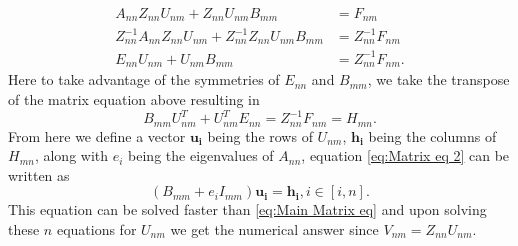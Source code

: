 \documentclass[11pt,letterpaper]{article}
\newcommand{\fpar}[1]{\left({#1}\right)} %
\begin{document}
\begin{align}
    A_{nn}Z_{nn}U_{nm}+Z_{nn}U_{nm}B_{mm} &= F_{nm}\nonumber\\
    Z_{nn}^{-1}A_{nn}Z_{nn}U_{nm}+Z_{nn}^{-1}Z_{nn}U_{nm}B_{mm} &= Z_{nn}^{-1}F_{nm}\nonumber\\
    E_{nn}U_{nm}+U_{nm}B_{mm} &= Z_{nn}^{-1}F_{nm}\nonumber.
\end{align}
Here to take advantage of the symmetries of $E_{nn}$ and $B_{mm}$, we take the transpose of the matrix equation above resulting in 
\begin{equation}\label{eq:Matrix eq 2}
    B_{mm}U^T_{nm} + U^T_{nm}E_{nn} = Z_{nn}^{-1}F_{nm} = H_{mn}.
\end{equation}
From here we define a vector $\mathbf{u_i}$ being the rows of $U_{nm}$, $\mathbf{h_i}$ being the columns of $H_{mn}$, along with $e_i$ being the eigenvalues of $A_{nn}$, equation \eqref{eq:Matrix eq 2} can be written as 
\begin{equation}
    \fpar{B_{mm}+e_iI_{mm}}\mathbf{u_i} = \mathbf{h_i}, i\in[i,n].
\end{equation}
This equation can be solved faster than \eqref{eq:Main Matrix eq} and upon solving these $n$ equations for $U_{nm}$ we get the numerical answer since $V_{nm} = Z_{nn}U_{nm}$.
\end{document}
